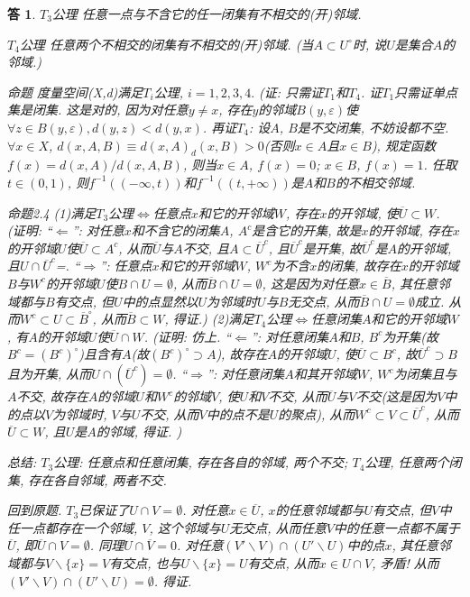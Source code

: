 \documentclass{ctexart}%
\newtheorem*{solution}{答}
\theoremstyle{definition}
\theoremstyle{remark}
\begin{document}
\begin{solution}

$T_3$公理 任意一点与不含它的任一闭集有不相交的(开)邻域.

$T_4$公理 任意两个不相交的闭集有不相交的(开)邻域. (当$A\subset U^\circ$时, 说$U$是集合$A$的邻域.)

命题 度量空间(X,d)满足$T_i$公理, $i=1,2,3,4.$ (证: 只需证$T_1$和$T_4$. 证$T_1$只需证单点集是闭集. 这是对的, 因为对任意$y\neq x$, 存在$y$的邻域$B(y,\varepsilon)$使$\forall z\in B(y,\varepsilon), d(y,z)< d(y,x)$. 再证$T_4$: 设$A$, $B$是不交闭集, 不妨设都不空. $\forall x\in X$, $d(x,A,B)\equiv d(x,A)_d(x,B)>0$(否则$x\in A$且$x\in B$), 规定函数$f(x)=d(x,A)/d(x,A,B)$, 则当$x\in A$, $f(x)=0$; $x\in B$, $f(x)=1$. 任取$t\in (0,1)$, 则$f^{-1}((-\infty,t))$和$f^{-1}((t,+\infty))$是$A$和$B$的不相交邻域. 

命题2.4 (1)满足$T_3$公理$\Longleftrightarrow $任意点$x$和它的开邻域$W$, 存在$x$的开邻域, 使$\overline{U}\subset W$. (证明: ``$\Longleftarrow$'': 对任意$x$和不含它的闭集$A$, $A^c$是含它的开集, 故是$x$的开邻域, 存在$x$的开邻域$U$使$\overline{U}\subset A^c$, 从而$\overline{U}$与$A$不交, 且$A\subset \overline{U}^c$, 且$\overline{U}^c$是开集, 故$\overline{U}^c$是$A$的开邻域, 且$U\cap \overline{U}^c$=\empty. ``$\Longrightarrow$'': 任意点$x$和它的开邻域$W$, $W^c$为不含$x$的闭集, 故存在$x$的开邻域$B$与$W^c$的开邻域$U$使$B\cap U=\emptyset$, 从而$\overline{B}\cap U = \emptyset$, 这是因为对任意$x\in \overline{B}$, 其任意邻域都与$B$有交点, 但$U$中的点显然以$U$为邻域时$U$与$B$无交点, 从而$\overline{B}\cap U = \emptyset$成立. 从而$W^c\subset U\subset \overline{B}^\circ$, 从而$\overline{B}\subset W$, 得证.) 
(2)满足$T_4$公理$\Longleftrightarrow$任意闭集$A$和它的开邻域$W$, 有$A$的开邻域$U$使$\overline{U}\cap W$. (证明: 仿上. ``$\Longleftarrow$'': 对任意闭集$A$和$B$, $B^c$为开集(故$B^c=(B^c)^\circ$)且含有$A$(故$(B^c)^\circ\supset A$), 故存在$A$的开邻域$U$, 使$\overline{U}\subset B^c$, 故$\overline{U}^c\supset B$且为开集, 从而$U\cap (\overline{U}^c)=\emptyset$. ``$\Longrightarrow$'': 对任意闭集$A$和其开邻域$W$, $W^c$为闭集且与$A$不交, 故存在$A$的邻域$U$和$W^c$的邻域$V$, 使$U$和$V$不交, 从而$\overline{U}$与$V$不交(这是因为$V$中的点以$V$为邻域时, $V$与$U$不交, 从而$V$中的点不是$U$的聚点), 从而$W^c\subset  V\subset \overline{U}^c$, 从而$\overline{U}\subset W$, 且$U$是$A$的邻域, 得证. )

总结: $T_3$公理: 任意点和任意闭集, 存在各自的邻域, 两个不交; $T_4$公理, 任意两个闭集, 存在各自邻域, 两者不交. 

回到原题. $T_3$已保证了$U\cap V=\emptyset$. 对任意$x\in \overline{U}$, $x$的任意邻域都与$U$有交点, 但$V$中任一点都存在一个邻域, $V$, 这个邻域与$U$无交点, 从而任意$V$中的任意一点都不属于$\overline{U}$, 即$\overline{U}\cap V=\emptyset$. 同理$U\cap\overline{V}=0$. 对任意$(V'\backslash V)\cap(U'\backslash U)$中的点$x$, 其任意邻域都与$V\backslash \{x\} =V$有交点, 也与$U\backslash \{x\} = U$有交点, 从而$x\in U\cap V$, 矛盾! 从而$(V'\backslash V)\cap(U'\backslash U)=\emptyset$. 得证. 
\end{solution}
\end{document}
